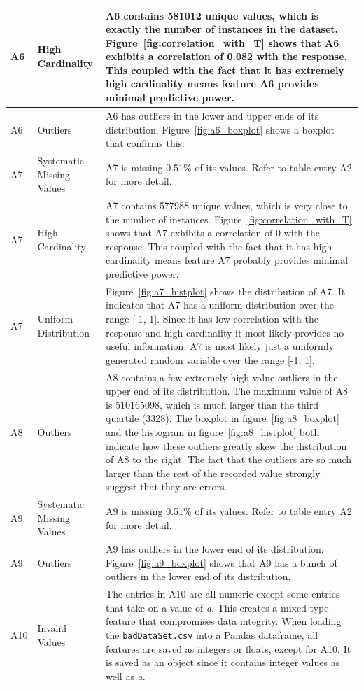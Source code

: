 \documentclass[11pt]{report}
\begin{document}
\begin{longtable}{lp{4cm}p{7cm}}
\midrule
A6 & High Cardinality & A6 contains 581012 unique values, which is exactly the number of instances in the dataset. Figure~\ref{fig:correlation_with_T} shows that A6 exhibits a correlation of 0.082 with the response. This coupled with the fact that it has extremely high cardinality means feature A6 provides minimal predictive power. \\
\midrule
A6 & Outliers & A6 has outliers in the lower and upper ends of its distribution. Figure~\ref{fig:a6_boxplot} shows a boxplot that confirms this. \\
\midrule
A7 & Systematic Missing Values & A7 is missing 0.51\% of its values.  Refer to table entry A2 for more detail. \\
\midrule
A7 & High Cardinality & A7 contains 577988 unique values, which is very close to the number of instances. Figure~\ref{fig:correlation_with_T} shows that A7 exhibits a correlation of 0 with the response. This coupled with the fact that it has high cardinality means feature A7 probably provides minimal predictive power. \\
\midrule
A7 & Uniform Distribution & Figure~\ref{fig:a7_histplot} shows the distribution of A7. It indicates that A7 has a uniform distribution over the range [-1, 1]. Since it has low correlation with the response and high cardinality it most likely provides no useful information. A7 is most likely just a uniformly generated random variable over the range [-1, 1]. \\
\midrule
A8 & Outliers & A8 contains a few extremely high value outliers in the upper end of its distribution. The maximum value of A8 is 510165098, which is much larger than the third quartile (3328). The boxplot in figure~\ref{fig:a8_boxplot} and the histogram in figure~\ref{fig:a8_histplot} both indicate how these outliers greatly skew the distribution of A8 to the right. The fact that the outliers are so much larger than the rest of the recorded value strongly suggest that they are errors. \\
\midrule
A9 & Systematic Missing Values & A9 is missing 0.51\% of its values.  Refer to table entry A2 for more detail. \\
\midrule
A9 & Outliers & A9 has outliers in the lower end of its distribution. Figure~\ref{fig:a9_boxplot} shows that A9 has a bunch of outliers in the lower end of its distribution. \\
\midrule
A10 & Invalid Values & The entries in A10 are all numeric except some entries that take on a value of \textit{a}. This creates a mixed-type feature that compromises data integrity. When loading the \texttt{badDataSet.csv} into a Pandas dataframe, all features are saved as integers or floats, except for A10. It is saved as an object since it contains integer values as well as \textit{a}. \\

\end{longtable}
\end{document}
